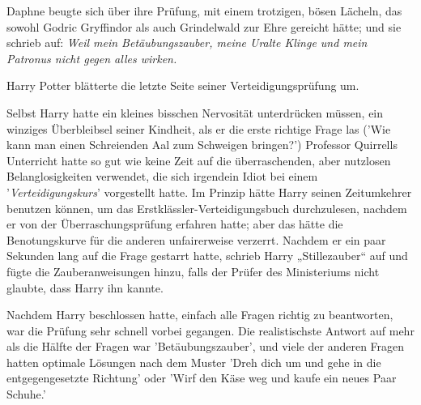 Daphne beugte sich über ihre Prüfung, mit einem trotzigen, bösen Lächeln, das sowohl Godric Gryffindor als auch Grindelwald zur Ehre gereicht hätte; und sie schrieb auf:
\emph{Weil mein Betäubungszauber, meine Uralte Klinge und mein Patronus nicht gegen alles wirken.}

\later

Harry Potter blätterte die letzte Seite seiner Verteidigungsprüfung um.

Selbst Harry hatte ein kleines bisschen Nervosität unterdrücken müssen, ein winziges Überbleibsel seiner Kindheit, als er die erste richtige Frage las
('Wie kann man einen Schreienden Aal zum Schweigen bringen?')
Professor Quirrells Unterricht hatte so gut wie keine Zeit auf die überraschenden, aber nutzlosen Belanglosigkeiten verwendet, die sich irgendein Idiot bei einem '\emph{Verteidigungskurs}' vorgestellt hatte. Im Prinzip hätte Harry seinen Zeitumkehrer benutzen können, um das Erstklässler-Verteidigungsbuch durchzulesen, nachdem er von der Überraschungsprüfung erfahren hatte; aber das hätte die Benotungskurve für die anderen unfairerweise verzerrt.
Nachdem er ein paar Sekunden lang auf die Frage gestarrt hatte, schrieb Harry „Stillezauber“ auf und fügte die Zauberanweisungen hinzu, falls der Prüfer des Ministeriums nicht glaubte, dass Harry ihn kannte.

Nachdem Harry beschlossen hatte, einfach alle Fragen richtig zu beantworten, war die Prüfung sehr schnell vorbei gegangen. Die realistischste Antwort auf mehr als die Hälfte der Fragen war 'Betäubungszauber', und viele der anderen Fragen hatten optimale Lösungen nach dem Muster 'Dreh dich um und gehe in die entgegengesetzte Richtung' oder 'Wirf den Käse weg und kaufe ein neues Paar Schuhe.'

